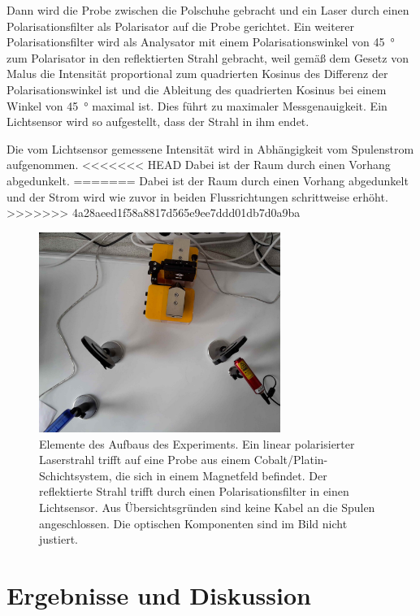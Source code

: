 \documentclass[
	a4paper,
	12pt,
	pagesize,
	ngerman
]{scrartcl}
\begin{document}
	Dann wird die Probe zwischen die Polschuhe gebracht und ein Laser durch einen Polarisationsfilter als Polarisator auf die Probe gerichtet.
	Ein weiterer Polarisationsfilter wird als Analysator mit einem Polarisationswinkel von \SI{45}{\degree} zum Polarisator in den reflektierten Strahl gebracht, weil gemäß dem Gesetz von Malus die Intensität proportional zum quadrierten Kosinus des Differenz der Polarisationswinkel ist und die Ableitung des quadrierten Kosinus bei einem Winkel von \SI{45}{\degree} maximal ist.
	Dies führt zu maximaler Messgenauigkeit. %
	Ein Lichtsensor wird so aufgestellt, dass der Strahl in ihm endet.
	
	Die vom Lichtsensor gemessene Intensität wird in Abhängigkeit vom Spulenstrom aufgenommen.
<<<<<<< HEAD
	Dabei ist der Raum durch einen Vorhang abgedunkelt. 
=======
	Dabei ist der Raum durch einen Vorhang abgedunkelt und der Strom wird wie zuvor in beiden Flussrichtungen schrittweise erhöht.
>>>>>>> 4a28aeed1f58a8817d565e9ee7ddd01db7d0a9ba
	
	\begin{figure}[H] 
		\includegraphics[width=0.7\textwidth]{O4_Aufbau} %
		\centering
		\caption{Elemente des Aufbaus des Experiments. Ein linear polarisierter Laserstrahl trifft auf eine Probe aus einem Cobalt/Platin-Schichtsystem, die sich in einem Magnetfeld befindet. Der reflektierte Strahl trifft durch einen Polarisationsfilter in einen Lichtsensor. Aus Übersichtsgründen sind keine Kabel an die Spulen angeschlossen. Die optischen Komponenten sind im Bild nicht justiert.} 
		\label{fig_aufbau}
		\centering
	\end{figure}
	
	\section{Ergebnisse und Diskussion}
	
\end{document}
